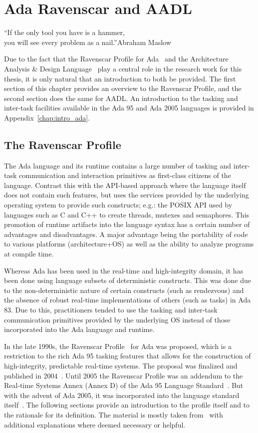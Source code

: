 \chapter{Ada Ravenscar and AADL}{``If the only tool you
  have is a hammer,\\you will see every problem as a nail.''}{Abraham
    Maslow}
\label{chap:aadlrs}

Due to the fact that the Ravenscar Profile for
Ada~\cite{burns@adalett04} and the Architecture Analysis \& Design
Language~\cite{AS5506} play a central role in the research work for
this thesis, it is only natural that an introduction to both be
provided. The first section of this chapter provides an overview to
the Ravenscar Profile, and the second section does the same for
AADL. An introduction to the tasking and inter-task facilities
available in the Ada 95 and Ada 2005 languages is provided in
Appendix~\ref{chap:intro_ada}.

\section{The Ravenscar Profile}
\label{sec:rsp}
The Ada language and its runtime contains a large number of tasking
and inter-task communication and interaction primitives as first-class
citizens of the language. Contrast this with the API-based approach
where the language itself does not contain such features, but uses the
services provided by the underlying operating system to provide such
constructs; e.g.: the POSIX API used by languages such as C and C++ to
create threads, mutexes and semaphores. This promotion of runtime
artifacts into the language syntax has a certain number of advantages
and disadvantages. A major advantage being the portability of code to
various platforms (architecture+OS) as well as the ability to analyze
programs at compile time.

Whereas Ada has been used in the real-time and high-integrity domain,
it has been done using language subsets of deterministic
constructs. This was done due to the non-deterministic nature of
certain constructs (such as rendezvous) and the absence of robust
real-time implementations of others (such as tasks) in Ada 83. Due to
this, practitioners tended to use the tasking and inter-task
communication primitives provided by the underlying OS instead of
those incorporated into the Ada language and runtime.

In the late 1990s, the Ravenscar Profile~\cite{burns@adalett99} for
Ada was proposed, which is a restriction to the rich Ada 95 tasking
features that allows for the construction of high-integrity,
predictable real-time systems. The proposal was finalized and
published in 2004~\cite{burns@adalett04}. Until 2005 the Ravenscar
Profile was an addendum to the Real-time Systems Annex (Annex D) of
the Ada 95 Language Standard~\cite{arm95}. But with the advent of Ada
2005, it was incorporated into the language standard
itself~\cite{arm05}. The following sections provide an introduction to
the profile itself and to the rationale for its definition. The
material is mostly taken from~\cite{burns@adalett04} with additional
explanations where deemed necessary or helpful.


